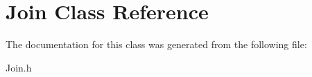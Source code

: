 \hypertarget{class_join}{\section{Join Class Reference}
\label{class_join}
}


The documentation for this class was generated from the following file\-:\begin{DoxyCompactItemize}
\item 
Join.\-h\end{DoxyCompactItemize}
